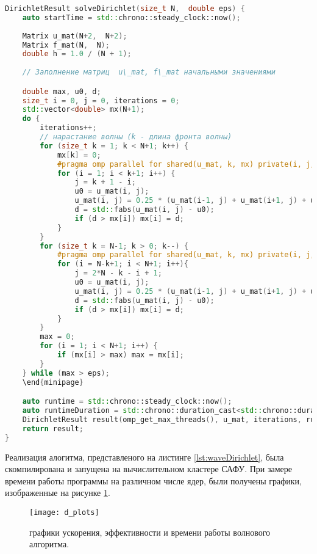 \documentclass[13pt]{article}
\begin{document}
	\noindent\begin{minipage}{\textwidth}
	\begin{lstlisting}[language=C++, caption={solveDirichlet(size\_t N, double eps)}, label={lst:waveDirichlet}, texcl=true]
DirichletResult solveDirichlet(size_t N,  double eps) {
	auto startTime = std::chrono::steady_clock::now();
	
	Matrix u_mat(N+2,  N+2);
	Matrix f_mat(N,  N);
	double h = 1.0 / (N + 1);
	
	// Заполнение матриц  u\_mat, f\_mat начальными значениями 

	double max, u0, d;
	size_t i = 0, j = 0, iterations = 0;
	std::vector<double> mx(N+1);
	do {
		iterations++;
		// нарастание волны (k - длина фронта волны)
		for (size_t k = 1; k < N+1; k++) {
			mx[k] = 0;
			#pragma omp parallel for shared(u_mat, k, mx) private(i, j, u0, d) schedule(static, 1)
			for (i = 1; i < k+1; i++) {
				j = k + 1 - i;
				u0 = u_mat(i, j);
				u_mat(i, j) = 0.25 * (u_mat(i-1, j) + u_mat(i+1, j) + u_mat(i, j-1) + u_mat(i, j+1) - h*h*f_mat(i-1, j-1));
				d = std::fabs(u_mat(i, j) - u0);
				if (d > mx[i]) mx[i] = d;
			}
		}
		for (size_t k = N-1; k > 0; k--) {
			#pragma omp parallel for shared(u_mat, k, mx) private(i, j, u0, d) schedule(static, 1)
			for (i = N-k+1; i < N+1; i++){
				j = 2*N - k - i + 1;
				u0 = u_mat(i, j);
				u_mat(i, j) = 0.25 * (u_mat(i-1, j) + u_mat(i+1, j) + u_mat(i, j-1) + u_mat(i, j+1) - h*h*f_mat(i-1, j-1));
				d = std::fabs(u_mat(i, j) - u0);
				if (d > mx[i]) mx[i] = d;				
			}
		}
		max = 0;
		for (i = 1; i < N+1; i++) {
			if (mx[i] > max) max = mx[i];
		}
	} while (max > eps);
	\end{minipage}

	auto runtime = std::chrono::steady_clock::now();
	auto runtimeDuration = std::chrono::duration_cast<std::chrono::duration<double>>(runtime - startTime);
	DirichletResult result(omp_get_max_threads(), u_mat, iterations, runtimeDuration.count(), eps);
	return result;
}
	\end{lstlisting}
	\end{minipage}

	Реализация алогитма, представленого на листинге \ref{lst:waveDirichlet}, была скомпилирована и запущена на вычислительном кластере САФУ. При замере времени работы программы на различном числе ядер, были получены графики, изображенные на рисунке \ref{fig:dplots}.
	
	\begin{figure}[h]
		\centering		\texttt{[image: d\_plots]}
		\caption{графики ускорения, эффективности и времени работы волнового алгоритма.}
		\label{fig:dplots} 
	\end{figure}
	
\end{document}

